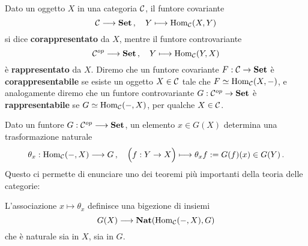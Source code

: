 



\begin{df}
	Dato un oggetto $X$ in una categoria $\mathcal{C}$, il funtore covariante
	\begin{equation*}
		\mathcal{C} \longrightarrow {\normalfont\textbf{Set}}\,, \quad Y \longmapsto \operatorname{Hom}_{\mathcal{C}}(X,Y)
	\end{equation*}
	si dice \textbf{corappresentato} da $X$, mentre il funtore controvariante
	\begin{equation*}
		\mathcal{C}^{op} \longrightarrow {\normalfont\textbf{Set}}\,, \quad Y \longmapsto \operatorname{Hom}_{\mathcal{C}}(Y,X)
	\end{equation*}
	è \textbf{rappresentato} da $X$. Diremo che un funtore covariante $F:\mathcal{C} \to {\normalfont\textbf{Set}}$
	è \textbf{corappresentabile} se esiste un oggetto $X \in \mathcal{C}$ tale che $F \simeq \operatorname{Hom}_{\mathcal{C}}(X,-)$,
	e analogamente diremo che un funtore controvariante $G:\mathcal{C}^{op} \to {\normalfont\textbf{Set}}$
	è \textbf{rappresentabile} se $G \simeq \operatorname{Hom}_{\mathcal{C}}(-,X)$, per qualche $X \in \mathcal{C}$.
\end{df}



Dato un funtore $G:\mathcal{C}^{op} \longrightarrow {\normalfont\textbf{Set}}$,
un elemento $x \in G(X)$ determina una trasformazione naturale
\begin{equation*}
	\theta_{x}: \operatorname{Hom}_{\mathcal{C}}(-,X) \longrightarrow G\,,
	\quad \Big(f: Y \to X \Big) \longmapsto \theta_{x}f := G(f)(x) \in G(Y)\,.
\end{equation*}
Questo ci permette di enunciare uno dei teoremi più importanti
della teoria delle categorie:
\begin{thm}\label{yoneda-lemma}
	L'associazione $x \mapsto \theta_{x}$ definisce una bigezione di insiemi
	\begin{equation*}
		G(X) \longrightarrow {\normalfont\textbf{Nat}}(\operatorname{Hom}_{\mathcal{C}}(-,X),G)
	\end{equation*}
	che è naturale sia in $X$, sia in $G$.
\end{thm}


